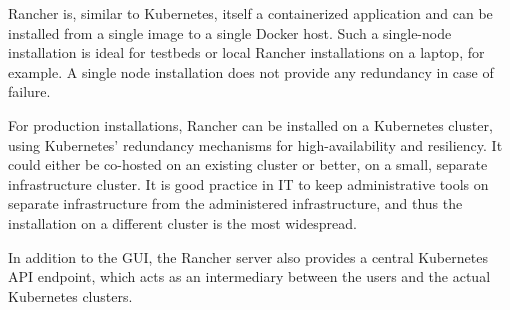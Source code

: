 Rancher is, similar to Kubernetes, itself a containerized application and can be installed from a single image to a single Docker host. Such a single-node installation is ideal for testbeds or local Rancher installations on a laptop, for example. A single node installation does not provide any redundancy in case of failure.

For production installations, Rancher can be installed on a Kubernetes cluster, using Kubernetes' redundancy mechanisms for high-availability and resiliency. It could either be co-hosted on an existing cluster or better, on a small, separate infrastructure cluster. It is good practice in IT to keep administrative tools on separate infrastructure from the administered infrastructure, and thus the installation on a different cluster is the most widespread.

In addition to the GUI, the Rancher server also provides a central Kubernetes API endpoint, which acts as an intermediary between the users and the actual Kubernetes clusters.
